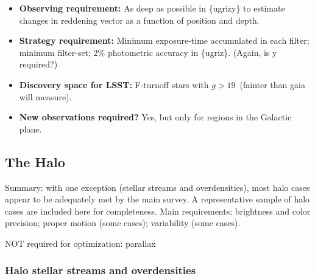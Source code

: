 \begin{itemize}
\item {\bf Observing requirement:} As deep as possible in \{ugrizy\} to estimate changes in reddening vector as a function of position and depth.
\vspace{-2mm}

\item {\bf Strategy requirement:} Minimum exposure-time accumulated in each filter; minimum filter-set; 2\% photometric accuracy in \{ugriz\}. {(Again, is y required?)}
\vspace{-2mm}

\item {\bf Discovery space for LSST:} F-turnoff stars with $g > 19$~(fainter than gaia will measure).
\vspace{-2mm}

\item {\bf New observations required?} Yes, but only for regions in the Galactic plane.
\vspace{-2mm}
\end{itemize}

\subsection{The Halo}

Summary: with one exception (stellar streams and overdensities), most
halo cases appear to be adequately met by the main survey. A
representative sample of halo cases are included here for
completeness. Main requirements: brightness and color precision;
proper motion (some cases); variability (some cases).

NOT required for optimization: parallax

\subsubsection{Halo stellar streams and overdensities}

